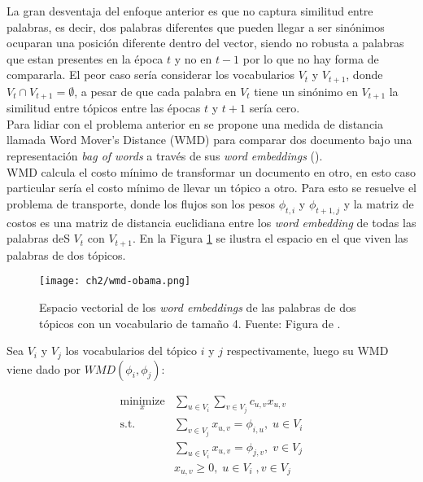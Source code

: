 \documentclass[letterpaper,12pt,oneside]{book} %
\begin{document}
La gran desventaja del enfoque anterior es que no captura similitud entre palabras, es decir, dos palabras diferentes que pueden llegar a ser sinónimos ocuparan una posición diferente dentro del vector, siendo no robusta a palabras que estan presentes en la época $t$ y no en $t-1$ por lo que no hay forma de compararla. El peor caso sería considerar los vocabularios $V_{t}$ y $V_{t+1}$, donde $V_{t}\cap V_{t+1} =  \emptyset$, a pesar de que cada palabra en $V_{t}$ tiene un sinónimo en $V_{t+1}$ la similitud entre tópicos entre las épocas $t$ y $t+1$ sería cero.\\

Para lidiar con el problema anterior en \citep{kusner2015word} se propone una medida de distancia llamada Word Mover's Distance (WMD) para comparar dos documento bajo una representación \textit{bag of words} a través de sus \textit{word embeddings} (\cite{mikolov2013distributed}).\\

WMD calcula el costo mínimo de transformar un documento en otro, en esto caso particular sería el costo mínimo de llevar un tópico a otro. Para esto se resuelve el problema de transporte, donde los flujos son los pesos $\phi_{t,i}$ y $\phi_{t+1,j}$ y la matriz de costos es una matriz de distancia euclidiana entre los \textit{word embedding} de todas las palabras deS $V_{t}$ con $V_{t+1}$. En la Figura \ref{img:wmd_obama} se ilustra el espacio en el que viven las palabras de dos tópicos.

\begin{figure}
    \centering
    \texttt{[image: ch2/wmd-obama.png]}
    \caption{Espacio vectorial de los \textit{word embeddings} de las palabras de dos tópicos con un vocabulario de tamaño 4. Fuente: Figura de \citep{WMDPy}.}
    \label{img:wmd_obama}
\end{figure}


Sea  $V_{i}$ y $V_{j}$ los vocabularios del tópico $i$ y $j$ respectivamente, luego su WMD viene dado por $WMD(\phi_{i}, \phi_{j})$:

\begin{align}
\underset{x}{\text{minimize}}&\sum_{u \in V_{i}}\sum_{v \in V_{j}} c_{u,v}x_{u,v} \\ 
\textrm{s.t.}\qquad &\sum_{v \in V_{j}}x_{u,v}= \phi_{i,u}, \; u \in V_{i}\\ 
& \sum_{u \in V_{i}}x_{u,v}= \phi_{j,v}, \; v\in V_{j}\\
& x_{u,v} \geq 0,\; u \in V_{i} \;, v \in V_{j}\\ \nonumber
\end{align}
\end{document}
